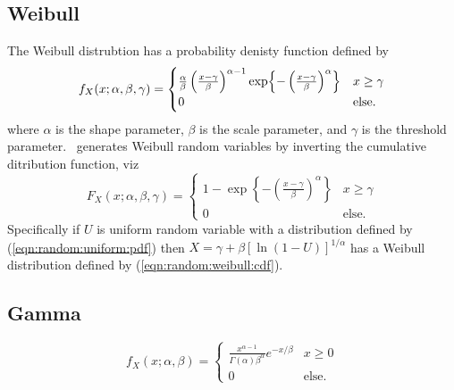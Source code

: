 % 
%
\subsection{Weibull}
\label{module:random:weibull}
The Weibull distrubtion has a probability denisty function defined by
%
\begin{equation}
\label{eqn:random:weibull:pdf}
    f_X(x;\alpha,\beta,\gamma) =
    \begin{cases}
        \frac{\alpha}{\beta}
        \left(
            \frac{x-\gamma}{\beta}
        \right)^{\alpha-1}
        \exp\Bigl\{
            -\left( \frac{x-\gamma}{\beta} \right)^\alpha
        \Bigr\}                         & \text{$x \ge \gamma$} \\
        0                               & \text{else}.
    \end{cases}
\end{equation}
%
where
$\alpha$ is the shape parameter,
$\beta$ is the scale parameter,
and
$\gamma$ is the threshold parameter.
%
\liquid\ generates Weibull random variables by inverting the cumulative
ditribution function, viz
%
\begin{equation}
\label{eqn:random:weibull:cdf}
    F_X(x;\alpha,\beta,\gamma) =
    \begin{cases}
        1 - \exp\left\{
            -\left(\frac{x-\gamma}{\beta}\right)^\alpha
        \right\} &                            x \ge \gamma \\
        0 &                                   \text{else}.
    \end{cases}
\end{equation}
%
Specifically if $U$ is uniform random variable with a distribution
defined by (\ref{eqn:random:uniform:pdf}) then
$X = \gamma + \beta\left[ \ln\left(1 - U\right) \right]^{1/\alpha}$
%
has a Weibull distribution defined by (\ref{eqn:random:weibull:cdf}).


% 
%
\subsection{Gamma}
\label{module:random:gamma}
%
\begin{equation}
\label{eqn:random:gamma:pdf}
    f_X(x;\alpha,\beta) =
    \begin{cases}
        \frac{
            x^{\alpha-1}
        }{
            \Gamma(\alpha) \beta^\alpha
        }
        e^{-x / \beta}                  & x \ge 0 \\
        0                               & \text{else}.
    \end{cases}
\end{equation}
%


